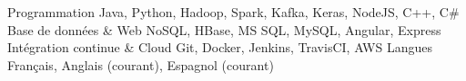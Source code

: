 \begin{cvskills}
	\cvskill
	{Programmation}
	{Java, Python, Hadoop, Spark, Kafka, Keras, NodeJS, C++, C\#}
	\cvskill
	{Base de données \& Web}
	{NoSQL, HBase, MS SQL, MySQL, Angular, Express}
	\cvskill
	{Intégration continue \& Cloud}
	{Git, Docker, Jenkins, TravisCI, AWS}
	\cvskill
	{Langues}
	{Français, Anglais (courant), Espagnol (courant)}
\end{cvskills}